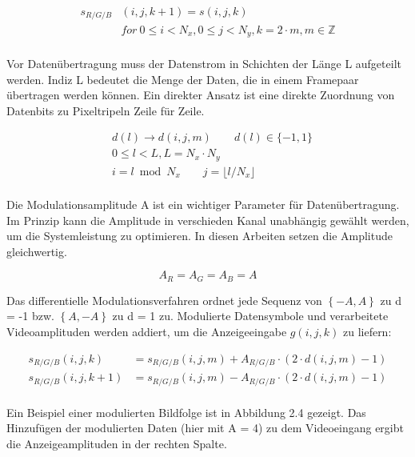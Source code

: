 \begin{equation}
\begin{split}
 s_{R/G/B}&(i,j,k+1) = s(i,j,k) \\
          &  for \ 0\le i <N_x, 0\le j<N_y,k=2 \cdot m , m \in \mathbb{Z}\\
\end{split}
\end{equation}

Vor Datenübertragung muss der Datenstrom in Schichten der Länge L aufgeteilt werden. Indiz L bedeutet die Menge der Daten, die in einem Framepaar übertragen werden können. Ein direkter Ansatz ist eine direkte Zuordnung von Datenbits zu Pixeltripeln Zeile für Zeile.

\begin{equation}
\begin{split}
  & d(l)\rightarrow d(i,j,m) \qquad d(l)\in \{-1,1\} \\
  & 0\le l <L,L = N_x \cdot N_y \\
  & i=l \bmod N_x \qquad j=\lfloor l/N_x \rfloor \\
\end{split}
\end{equation}

Die Modulationsamplitude A ist ein wichtiger Parameter für Datenübertragung. Im Prinzip kann die Amplitude in verschieden Kanal unabhängig gewählt werden, um die Systemleistung zu optimieren. In diesen Arbeiten setzen die Amplitude gleichwertig.

\begin{equation}
 A_R=A_G=A_B=A        
\end{equation}

Das differentielle Modulationsverfahren ordnet jede Sequenz von $\left\{-A, A\right\}$ zu d = -1 bzw. $\left\{A, -A\right\}$ zu d = 1 zu. Modulierte Datensymbole und verarbeitete Videoamplituden werden addiert, um die Anzeigeeingabe $g(i,j,k)$ zu liefern:

\begin{equation}
\begin{split}
   s_{R/G/B}(i,j,k)  &= s_{R/G/B}(i,j,m) + A_{R/G/B} \cdot \left( 2 \cdot d(i,j,m) - 1 \right) \\
   s_{R/G/B}(i,j,k+1)&= s_{R/G/B}(i,j,m) - A_{R/G/B} \cdot \left( 2 \cdot d(i,j,m) - 1 \right) \\
\end{split}
\end{equation}

Ein Beispiel einer modulierten Bildfolge ist in Abbildung 2.4 gezeigt. Das Hinzufügen der modulierten Daten (hier mit A = 4) zu dem Videoeingang ergibt die Anzeigeamplituden in der rechten Spalte.
\newpage

